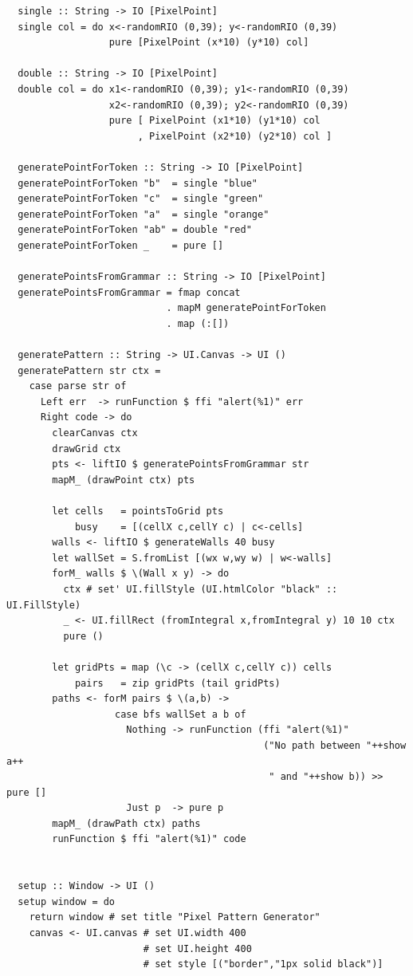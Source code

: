 \documentclass[areasetadvanced]{scrartcl}
\begin{document}
\begin{lstlisting}
  single :: String -> IO [PixelPoint]
  single col = do x<-randomRIO (0,39); y<-randomRIO (0,39)
                  pure [PixelPoint (x*10) (y*10) col]
  
  double :: String -> IO [PixelPoint]
  double col = do x1<-randomRIO (0,39); y1<-randomRIO (0,39)
                  x2<-randomRIO (0,39); y2<-randomRIO (0,39)
                  pure [ PixelPoint (x1*10) (y1*10) col
                       , PixelPoint (x2*10) (y2*10) col ]
  
  generatePointForToken :: String -> IO [PixelPoint]
  generatePointForToken "b"  = single "blue"
  generatePointForToken "c"  = single "green"
  generatePointForToken "a"  = single "orange"
  generatePointForToken "ab" = double "red"
  generatePointForToken _    = pure []
  
  generatePointsFromGrammar :: String -> IO [PixelPoint]
  generatePointsFromGrammar = fmap concat
                            . mapM generatePointForToken
                            . map (:[])
  
  generatePattern :: String -> UI.Canvas -> UI ()
  generatePattern str ctx =
    case parse str of
      Left err  -> runFunction $ ffi "alert(%1)" err
      Right code -> do
        clearCanvas ctx
        drawGrid ctx
        pts <- liftIO $ generatePointsFromGrammar str
        mapM_ (drawPoint ctx) pts
  
        let cells   = pointsToGrid pts
            busy    = [(cellX c,cellY c) | c<-cells]
        walls <- liftIO $ generateWalls 40 busy
        let wallSet = S.fromList [(wx w,wy w) | w<-walls]
        forM_ walls $ \(Wall x y) -> do
          ctx # set' UI.fillStyle (UI.htmlColor "black" :: UI.FillStyle)
          _ <- UI.fillRect (fromIntegral x,fromIntegral y) 10 10 ctx
          pure ()
  
        let gridPts = map (\c -> (cellX c,cellY c)) cells
            pairs   = zip gridPts (tail gridPts)
        paths <- forM pairs $ \(a,b) ->
                   case bfs wallSet a b of
                     Nothing -> runFunction (ffi "alert(%1)"
                                             ("No path between "++show a++
                                              " and "++show b)) >> pure []
                     Just p  -> pure p
        mapM_ (drawPath ctx) paths
        runFunction $ ffi "alert(%1)" code
  
  
  setup :: Window -> UI ()
  setup window = do
    return window # set title "Pixel Pattern Generator"
    canvas <- UI.canvas # set UI.width 400
                        # set UI.height 400
                        # set style [("border","1px solid black")]
  

\end{lstlisting}
\end{document}
